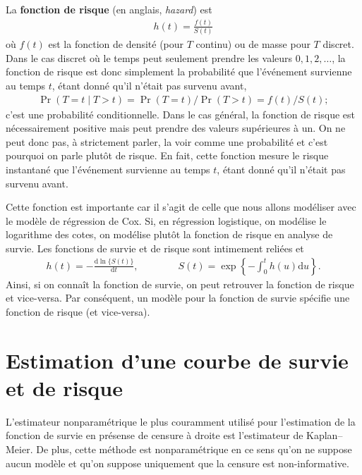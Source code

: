 \documentclass[
  11pt,
  letterpaper,
]{scrbook}
\theoremstyle{definition}
\theoremstyle{remark}
\begin{document}
La \textbf{fonction de risque} (en anglais, \emph{hazard}) est
\begin{align*}
h(t) =  \frac{f(t)}{S(t)}
\end{align*} où \(f(t)\) est la fonction de densité (pour \(T\) continu)
ou de masse pour \(T\) discret. Dans le cas discret où le temps peut
seulement prendre les valeurs \(0, 1, 2, \ldots\), la fonction de risque
est donc simplement la probabilité que l'événement survienne au temps
\(t\), étant donné qu'il n'était pas survenu avant, \begin{align*}
\Pr(T=t \mid T > t) = \Pr(T=t) / \Pr(T >t) = f(t)/S(t);
\end{align*} c'est une probabilité conditionnelle. Dans le cas général,
la fonction de risque est nécessairement positive mais peut prendre des
valeurs supérieures à un. On ne peut donc pas, à strictement parler, la
voir comme une probabilité et c'est pourquoi on parle plutôt de risque.
En fait, cette fonction mesure le risque instantané que l'événement
survienne au temps \(t\), étant donné qu'il n'était pas survenu avant.

Cette fonction est importante car il s'agit de celle que nous allons
modéliser avec le modèle de régression de Cox. Si, en régression
logistique, on modélise le logarithme des cotes, on modélise plutôt la
fonction de risque en analyse de survie. Les fonctions de survie et de
risque sont intimement reliées et \begin{align*}
h(t) = - \frac{\mathrm{d} \ln\{S(t)\}}{\mathrm{d} t}, \qquad \qquad S(t) = \exp \left\{ -\int_0^t h(u) \mathrm{d} u\right\}.
\end{align*} Ainsi, si on connaît la fonction de survie, on peut
retrouver la fonction de risque et vice-versa. Par conséquent, un modèle
pour la fonction de survie spécifie une fonction de risque (et
vice-versa).

\hypertarget{estimation-dune-courbe-de-survie-et-de-risque}{%
\section{Estimation d'une courbe de survie et de
risque}\label{estimation-dune-courbe-de-survie-et-de-risque}}

L'estimateur nonparamétrique le plus couramment utilisé pour
l'estimation de la fonction de survie en présense de censure à droite
est l'estimateur de Kaplan--Meier. De plus, cette méthode est
nonparamétrique en ce sens qu'on ne suppose aucun modèle et qu'on
suppose uniquement que la censure est non-informative.
\end{document}
